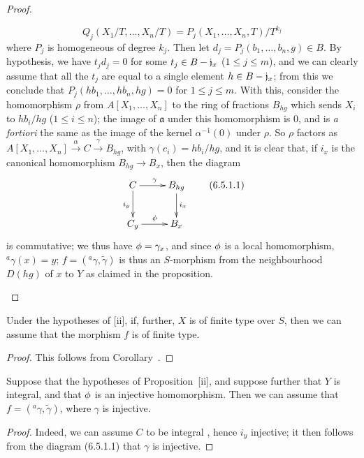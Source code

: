 \begin{proof}
\begin{enumerate}
    \[
      Q_j(X_1/T,\ldots,X_n/T)=P_j(X_1,\ldots,X_n,T)/T^{k_j}
    \]
    where $P_j$ is homogeneous of degree $k_j$.
    Then let $d_j=P_j(b_1,\ldots,b_n,g)\in B$.
    By hypothesis, we have $t_jd_j=0$ for some $t_j\in B-\mathfrak{j}_x$ ($1\leq j\leq m$), and we can clearly assume that all the $t_j$ are equal to a single element $h\in B-\mathfrak{j}_x$;
    from this we conclude that $P_j(hb_1,\ldots,hb_n,hg)=0$ for $1\leq j\leq m$.
    With this, consider the homomorphism $\rho$ from $A[X_1,\ldots,X_n]$ to the ring of fractions $B_{hg}$ which sends $X_i$ to $hb_i/hg$ ($1\leq i\leq n$);
    the image of $\mathfrak{a}$ under this homomorphism is $0$, and is \emph{a fortiori} the same as the image of the kernel $\alpha^{-1}(0)$ under $\rho$.
    So $\rho$ factors as $A[X_1,\ldots,X_n]\xrightarrow{\alpha}C\xrightarrow{\gamma}B_{hg}$, with $\gamma(c_i)=hb_i/hg$, and it is clear that, if $i_x$ is the canonical homomorphism $B_{hg}\to B_x$, then the diagram
    \[
    \label{I.6.5.1.1}
      \xymatrix{
        C\ar[r]^\gamma\ar[d]_{i_y} &
        B_{hg}\ar[d]^{i_x}\\
        C_y\ar[r]^\vphi &
        B_x
      }
      \tag{6.5.1.1}
    \]
    is commutative; we thus have $\phi=\gamma_x$, and since $\phi$ is a local homomorphism, $^a\gamma(x)=y$;
    $f=({}^a\gamma,\widetilde{\gamma})$ is thus an $S$-morphism from the neighbourhood $D(hg)$ of $x$ to $Y$ as claimed in the proposition.
\end{enumerate}
\end{proof}

\begin{corollary}[6.5.2]
\label{I.6.5.2}
Under the hypotheses of [ii], if, further, $X$ is of finite type over $S$, then we can assume that the morphism $f$ is of finite type.
\end{corollary}

\begin{proof}
This follows from Corollary~.
\end{proof}

\begin{corollary}[6.5.3]
\label{I.6.5.3}
Suppose that the hypotheses of Proposition~[ii], and suppose further that $Y$ is integral, and that $\phi$ is an injective homomorphism.
Then we can assume that $f=({}^a\gamma,\widetilde{\gamma})$, where $\gamma$ is injective.
\end{corollary}

\begin{proof}
Indeed, we can assume $C$ to be integral , hence $i_y$ injective; it then follows from the diagram (6.5.1.1) that $\gamma$ is injective.
\end{proof}


